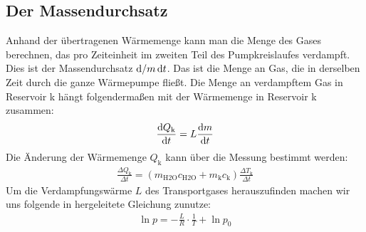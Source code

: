 \subsection{Der Massendurchsatz \cite[vgl.][]{man:v206}}
Anhand der übertragenen Wärmemenge kann man die Menge des Gases berechnen, das pro Zeiteinheit
im zweiten Teil des Pumpkreislaufes verdampft.
Dies ist der Massendurchsatz $\mathop{}\!\mathrm{d} / m\mathop{}\!\mathrm{d} t$.
Das ist die Menge an Gas, die in derselben Zeit durch die ganze Wärmepumpe fließt.
Die Menge an verdampftem Gas in Reservoir k hängt folgendermaßen mit der Wärmemenge in Reservoir k zusammen:
\begin{align}
    \frac{\mathop{}\!\mathrm{d} Q_\text{k}}{\mathop{}\!\mathrm{d} t} = L \frac{\mathop{}\!\mathrm{d} m}{\mathop{}\!\mathrm{d} t}
    \label{eq:massedurchsatz}
\end{align} 
Die Änderung der Wärmemenge $ Q_\text{k}$ kann über die Messung bestimmt werden:
\begin{align}
    \frac{\Delta Q_\text{k}}{\Delta t} = (m_\text{H2O} c_{\text{H2O}} + m_\text{k} c_\text{k}) \frac{\Delta T_\text{k}}{\Delta t}
    \label{eq:aenderung_q2}
\end{align} 
Um die Verdampfungswärme $L$ des Transportgases herauszufinden machen wir uns folgende in \cite[][5]{man:v203} hergeleitete
Gleichung zunutze:
\begin{align}
    \ln{p} = -\frac{L}{R}\cdot \frac{1}{T} + \ln{p_0}
    \label{eq:Dampfdruckkurve}
\end{align}